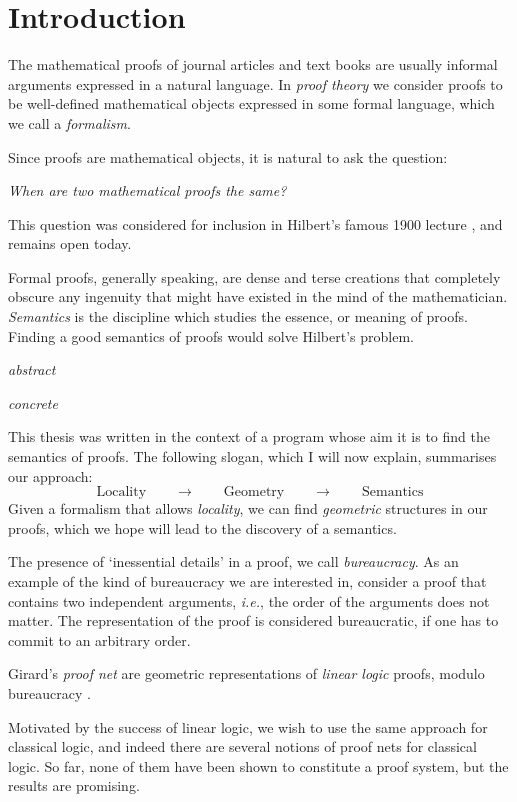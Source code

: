\chapter{Introduction}

The mathematical proofs of journal articles and text books are usually informal arguments expressed in a natural language. In \emph{proof theory} we consider proofs to be well-defined mathematical objects expressed in some formal language, which we call a \emph{formalism}.

Since proofs are mathematical objects, it is natural to ask the question:

\emph{When are two mathematical proofs the same?}

This question was considered for inclusion in Hilbert's famous 1900 lecture \cite{Thie:03:Hilberts:yu}, and remains open today.

Formal proofs, generally speaking, are dense and terse creations that completely obscure any ingenuity that might have existed in the mind of the mathematician. \emph{Semantics} is the discipline which studies the essence, or meaning of proofs. Finding a good semantics of proofs would solve Hilbert's problem.

\emph{abstract}

\emph{concrete}

This thesis was written in the context of a program whose aim it is to find the semantics of proofs. The following slogan, which I will now explain, summarises our approach:
\[
\mbox{Locality}\qquad\rightarrow\qquad\mbox{Geometry}\qquad\rightarrow\qquad\mbox{Semantics}
\]
Given a formalism that allows \emph{locality}, we can find \emph{geometric} structures in our proofs, which we hope will lead to the discovery of a semantics.

The presence of `inessential details' in a proof, we call \emph{bureaucracy}. As an example of the kind of bureaucracy we are interested in, consider a proof that contains two independent arguments, \emph{i.e.}, the order of the arguments does not matter. The representation of the proof is considered bureaucratic, if one has to commit to an arbitrary order.

Girard's \emph{proof net} are geometric representations of \emph{linear logic} proofs, modulo bureaucracy \cite{Gira:87:Linear-L:wm}.


Motivated by the success of linear logic, we wish to use the same approach for classical logic, and indeed there are several notions of proof nets for classical logic. So far, none of them have been shown to constitute a proof system, but the results are promising.

